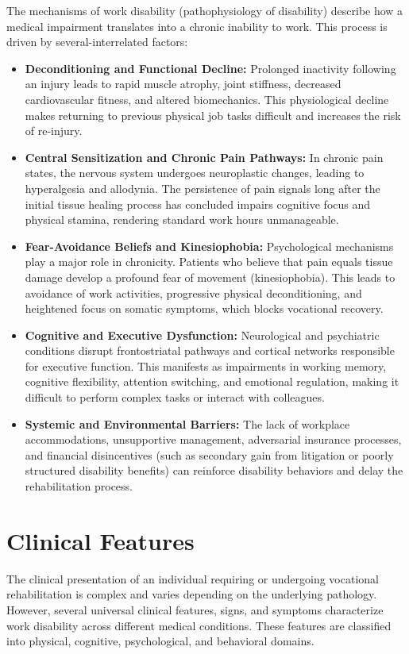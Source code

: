 The mechanisms of work disability (pathophysiology of disability) describe how a medical impairment translates into a chronic inability to work. This process is driven by several-interrelated factors:
\begin{itemize}
    \item \textbf{Deconditioning and Functional Decline:} Prolonged inactivity following an injury leads to rapid muscle atrophy, joint stiffness, decreased cardiovascular fitness, and altered biomechanics. This physiological decline makes returning to previous physical job tasks difficult and increases the risk of re-injury.
    \item \textbf{Central Sensitization and Chronic Pain Pathways:} In chronic pain states, the nervous system undergoes neuroplastic changes, leading to hyperalgesia and allodynia. The persistence of pain signals long after the initial tissue healing process has concluded impairs cognitive focus and physical stamina, rendering standard work hours unmanageable.
    \item \textbf{Fear-Avoidance Beliefs and Kinesiophobia:} Psychological mechanisms play a major role in chronicity. Patients who believe that pain equals tissue damage develop a profound fear of movement (kinesiophobia). This leads to avoidance of work activities, progressive physical deconditioning, and heightened focus on somatic symptoms, which blocks vocational recovery.
    \item \textbf{Cognitive and Executive Dysfunction:} Neurological and psychiatric conditions disrupt frontostriatal pathways and cortical networks responsible for executive function. This manifests as impairments in working memory, cognitive flexibility, attention switching, and emotional regulation, making it difficult to perform complex tasks or interact with colleagues.
    \item \textbf{Systemic and Environmental Barriers:} The lack of workplace accommodations, unsupportive management, adversarial insurance processes, and financial disincentives (such as secondary gain from litigation or poorly structured disability benefits) can reinforce disability behaviors and delay the rehabilitation process.
\end{itemize}

\section*{Clinical Features}
The clinical presentation of an individual requiring or undergoing vocational rehabilitation is complex and varies depending on the underlying pathology. However, several universal clinical features, signs, and symptoms characterize work disability across different medical conditions. These features are classified into physical, cognitive, psychological, and behavioral domains.

